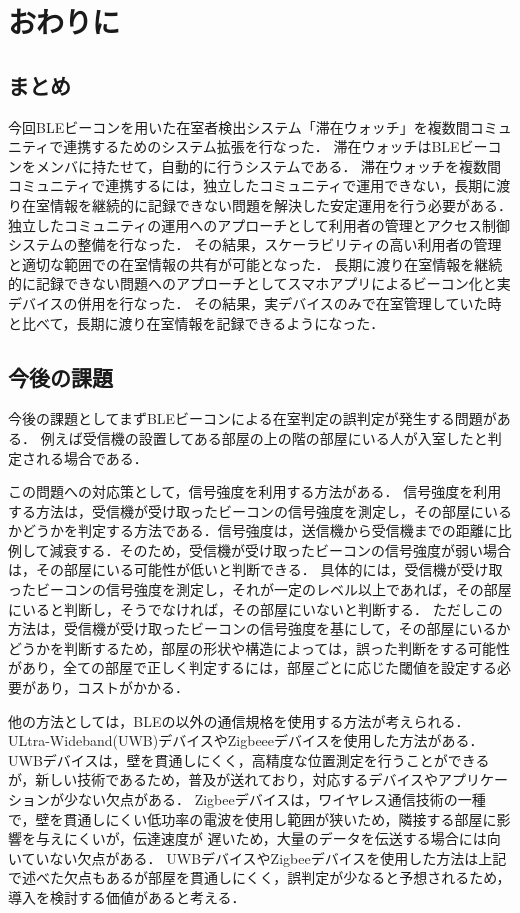 \chapter{おわりに}\label{5}
\thispagestyle{myheadings}

\section{まとめ}

今回BLEビーコンを用いた在室者検出システム「滞在ウォッチ」を複数間コミュニティで連携するためのシステム拡張を行なった．
滞在ウォッチはBLEビーコンをメンバに持たせて，自動的に行うシステムである．
滞在ウォッチを複数間コミュニティで連携するには，独立したコミュニティで運用できない，長期に渡り在室情報を継続的に記録できない問題を解決した安定運用を行う必要がある．
独立したコミュニティの運用へのアプローチとして利用者の管理とアクセス制御システムの整備を行なった．
その結果，スケーラビリティの高い利用者の管理と適切な範囲での在室情報の共有が可能となった．
長期に渡り在室情報を継続的に記録できない問題へのアプローチとしてスマホアプリによるビーコン化と実デバイスの併用を行なった．
その結果，実デバイスのみで在室管理していた時と比べて，長期に渡り在室情報を記録できるようになった．


\section{今後の課題}

今後の課題としてまずBLEビーコンによる在室判定の誤判定が発生する問題がある．
例えば受信機の設置してある部屋の上の階の部屋にいる人が入室したと判定される場合である．

この問題への対応策として，信号強度を利用する方法がある．
信号強度を利用する方法は，受信機が受け取ったビーコンの信号強度を測定し，その部屋にいるかどうかを判定する方法である．信号強度は，送信機から受信機までの距離に比例して減衰する．そのため，受信機が受け取ったビーコンの信号強度が弱い場合は，その部屋にいる可能性が低いと判断できる．
具体的には，受信機が受け取ったビーコンの信号強度を測定し，それが一定のレベル以上であれば，その部屋にいると判断し，そうでなければ，その部屋にいないと判断する．
ただしこの方法は，受信機が受け取ったビーコンの信号強度を基にして，その部屋にいるかどうかを判断するため，部屋の形状や構造によっては，誤った判断をする可能性があり，全ての部屋で正しく判定するには，部屋ごとに応じた閾値を設定する必要があり，コストがかかる．

他の方法としては，BLEの以外の通信規格を使用する方法が考えられる．
ULtra-Wideband(UWB)デバイスやZigbeeeデバイスを使用した方法がある．
UWBデバイスは，壁を貫通しにくく，高精度な位置測定を行うことができるが，新しい技術であるため，普及が送れており，対応するデバイスやアプリケーションが少ない欠点がある．
Zigbeeデバイスは，ワイヤレス通信技術の一種で，壁を貫通しにくい低功率の電波を使用し範囲が狭いため，隣接する部屋に影響を与えにくいが，伝達速度が
遅いため，大量のデータを伝送する場合には向いていない欠点がある．
UWBデバイスやZigbeeデバイスを使用した方法は上記で述べた欠点もあるが部屋を貫通しにくく，誤判定が少なると予想されるため，導入を検討する価値があると考える．

